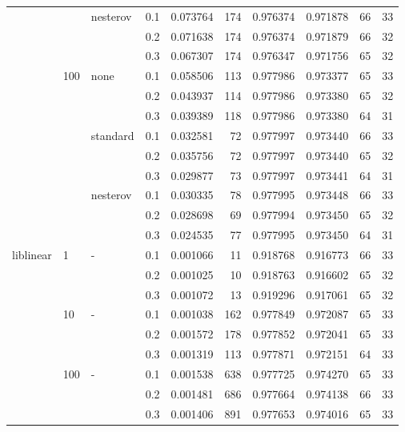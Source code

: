 \begin{table}[H]
\begin{tabular}{llllrrrrrr}
          &     & nesterov & 0.1 &  0.073764 &     174 &  0.976374 &  0.971878 &          66 &        33 \\
          &     &   & 0.2 &  0.071638 &     174 &  0.976374 &  0.971879 &          66 &        32 \\
          &     &   & 0.3 &  0.067307 &     174 &  0.976347 &  0.971756 &          65 &        32 \\
          & 100 & none & 0.1 &  0.058506 &     113 &  0.977986 &  0.973377 &          65 &        33 \\
          &     &   & 0.2 &  0.043937 &     114 &  0.977986 &  0.973380 &          65 &        32 \\
          &     &   & 0.3 &  0.039389 &     118 &  0.977986 &  0.973380 &          64 &        31 \\
          &     & standard & 0.1 &  0.032581 &      72 &  0.977997 &  0.973440 &          66 &        33 \\
          &     &   & 0.2 &  0.035756 &      72 &  0.977997 &  0.973440 &          65 &        32 \\
          &     &   & 0.3 &  0.029877 &      73 &  0.977997 &  0.973441 &          64 &        31 \\
          &     & nesterov & 0.1 &  0.030335 &      78 &  0.977995 &  0.973448 &          66 &        33 \\
          &     &   & 0.2 &  0.028698 &      69 &  0.977994 &  0.973450 &          65 &        32 \\
          &     &   & 0.3 &  0.024535 &      77 &  0.977995 &  0.973450 &          64 &        31 \\
liblinear & 1   & - & 0.1 &  0.001066 &      11 &  0.918768 &  0.916773 &          66 &        33 \\
          &     &   & 0.2 &  0.001025 &      10 &  0.918763 &  0.916602 &          65 &        32 \\
          &     &   & 0.3 &  0.001072 &      13 &  0.919296 &  0.917061 &          65 &        32 \\
          & 10  & - & 0.1 &  0.001038 &     162 &  0.977849 &  0.972087 &          65 &        33 \\
          &     &   & 0.2 &  0.001572 &     178 &  0.977852 &  0.972041 &          65 &        33 \\
          &     &   & 0.3 &  0.001319 &     113 &  0.977871 &  0.972151 &          64 &        33 \\
          & 100 & - & 0.1 &  0.001538 &     638 &  0.977725 &  0.974270 &          65 &        33 \\
          &     &   & 0.2 &  0.001481 &     686 &  0.977664 &  0.974138 &          66 &        33 \\
          &     &   & 0.3 &  0.001406 &     891 &  0.977653 &  0.974016 &          65 &        33 \\
\bottomrule
\end{tabular}
\end{table}
